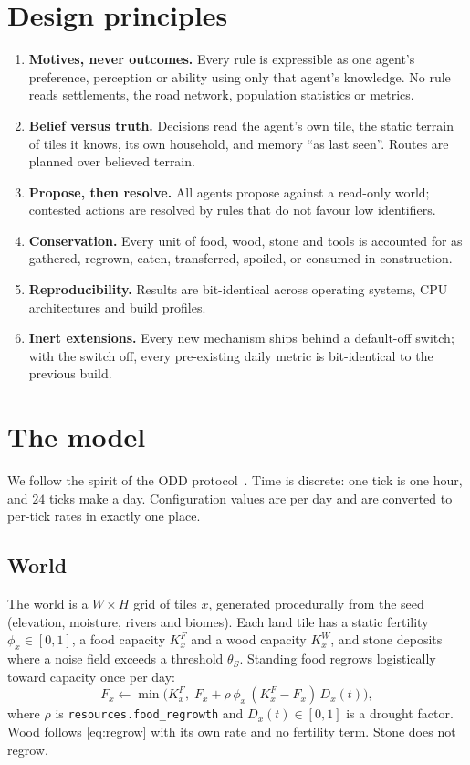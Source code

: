 \documentclass[11pt]{article}
\theoremstyle{definition}
\newcommand{\1}{\mathbf{1}}
\newcommand{\cfg}[1]{\texttt{\small #1}}
\begin{document}
\section{Design principles}\label{sec:principles}

\begin{enumerate}[label=\textbf{P\arabic*.}]
\item \textbf{Motives, never outcomes.} Every rule is expressible as one agent's preference, perception or ability using only that agent's knowledge. No rule reads settlements, the road network, population statistics or metrics.
\item \textbf{Belief versus truth.} Decisions read the agent's own tile, the static terrain of tiles it knows, its own household, and memory ``as last seen''. Routes are planned over believed terrain.
\item \textbf{Propose, then resolve.} All agents propose against a read-only world; contested actions are resolved by rules that do not favour low identifiers.
\item \textbf{Conservation.} Every unit of food, wood, stone and tools is accounted for as gathered, regrown, eaten, transferred, spoiled, or consumed in construction.
\item \textbf{Reproducibility.} Results are bit-identical across operating systems, CPU architectures and build profiles.
\item \textbf{Inert extensions.} Every new mechanism ships behind a default-off switch; with the switch off, every pre-existing daily metric is bit-identical to the previous build.
\end{enumerate}

\section{The model}\label{sec:model}

We follow the spirit of the ODD protocol~\cite{grimm2020}. Time is discrete: one tick is one hour, and $24$ ticks make a day. Configuration values are per day and are converted to per-tick rates in exactly one place.

\subsection{World}
The world is a $W\times H$ grid of tiles $x$, generated procedurally from the seed (elevation, moisture, rivers and biomes). Each land tile has a static fertility $\phi_x\in[0,1]$, a food capacity $K^F_x$ and a wood capacity $K^W_x$, and stone deposits where a noise field exceeds a threshold $\theta_S$. Standing food regrows logistically toward capacity once per day:
\begin{equation}
F_x \leftarrow \min\!\Big(K^F_x,\; F_x + \rho\,\phi_x\,(K^F_x - F_x)\,D_x(t)\Big),
\label{eq:regrow}
\end{equation}
where $\rho$ is \cfg{resources.food\_regrowth} and $D_x(t)\in[0,1]$ is a drought factor. Wood follows \eqref{eq:regrow} with its own rate and no fertility term. Stone does not regrow.
\end{document}

